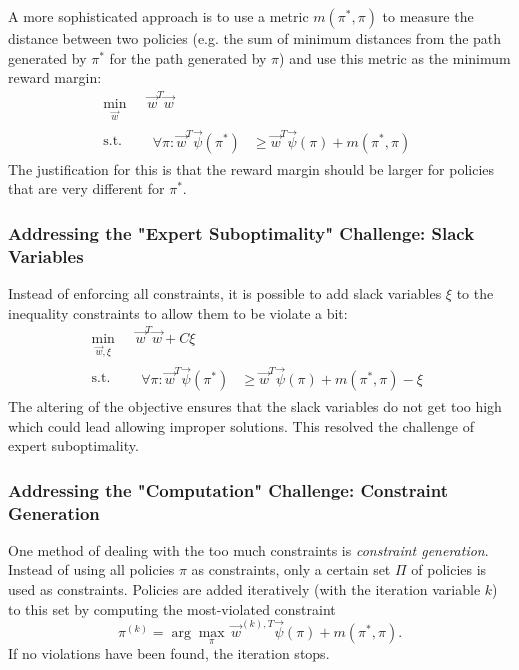 				A more sophisticated approach is to use a metric \( m(\pi^\ast, \pi) \) to measure the distance between two policies (e.g. the sum of minimum distances from the path generated by \(\pi^\ast\) for the path generated by \(\pi\)) and use this metric as the minimum reward margin:
				\begin{equation*}
					\begin{aligned}
						\min_{\vec{w}} \,   & \vec{w}^T \vec{w} \\
						\mathrm{s.t.} \quad &
						\begin{aligned}
							\forall\pi : \vec{w}^T \vec{\psi}(\pi^\ast) & \geq \vec{w}^T \vec{\psi}(\pi) + m(\pi^\ast, \pi)
						\end{aligned}
					\end{aligned}
				\end{equation*}
				The justification for this is that the reward margin should be larger for policies that are very different for \(\pi^\ast\).

			\subsubsection{Addressing the "Expert Suboptimality" Challenge: Slack Variables}
				Instead of enforcing all constraints, it is possible to add slack variables \(\xi\) to the inequality constraints to allow them to be violate a bit:
				\begin{equation*}
					\begin{aligned}
						\min_{\vec{w}, \xi} \, & \vec{w}^T \vec{w} + C \xi \\
						\mathrm{s.t.} \quad    &
						\begin{aligned}
							\forall\pi : \vec{w}^T \vec{\psi}(\pi^\ast) & \geq \vec{w}^T \vec{\psi}(\pi) + m(\pi^\ast, \pi) - \xi
						\end{aligned}
					\end{aligned}
				\end{equation*}
				The altering of the objective ensures that the slack variables do not get too high which could lead allowing improper solutions. This resolved the challenge of expert suboptimality.


			\subsubsection{Addressing the "Computation" Challenge: Constraint Generation}
				One method of dealing with the too much constraints is \emph{constraint generation}. Instead of using all policies \(\pi\) as constraints, only a certain set \( \Pi \) of policies is used as constraints. Policies are added iteratively (with the iteration variable \(k\)) to this set by computing the most-violated constraint
				\begin{equation*}
					\pi^{(k)} = \arg\max_\pi\, \vec{w}^{(k), T} \vec{\psi}(\pi) + m(\pi^\ast, \pi).
				\end{equation*}
				If no violations have been found, the iteration stops.

